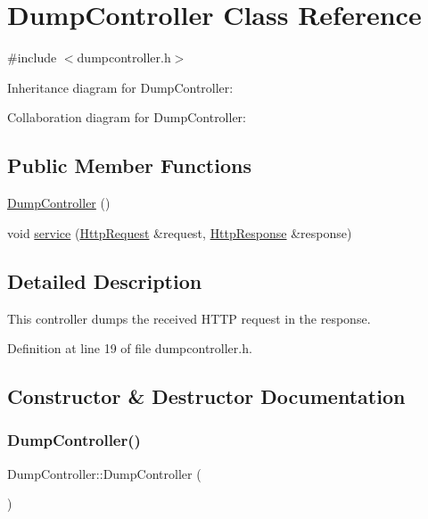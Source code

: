 \hypertarget{class_dump_controller}{}\section{Dump\+Controller Class Reference}
\label{class_dump_controller}


{\ttfamily \#include $<$dumpcontroller.\+h$>$}



Inheritance diagram for Dump\+Controller\+:


Collaboration diagram for Dump\+Controller\+:
\subsection*{Public Member Functions}
\begin{DoxyCompactItemize}
\item 
\mbox{\hyperlink{class_dump_controller_a430cd1a52b540639ad197abb92b4f00d}{Dump\+Controller}} ()
\item 
void \mbox{\hyperlink{class_dump_controller_ab2d5b920d9b2ec9310d2e57ed1e8e32f}{service}} (\mbox{\hyperlink{classstefanfrings_1_1_http_request}{Http\+Request}} \&request, \mbox{\hyperlink{classstefanfrings_1_1_http_response}{Http\+Response}} \&response)
\end{DoxyCompactItemize}


\subsection{Detailed Description}
This controller dumps the received H\+T\+TP request in the response. 

Definition at line 19 of file dumpcontroller.\+h.



\subsection{Constructor \& Destructor Documentation}
\mbox{\label{class_dump_controller_a430cd1a52b540639ad197abb92b4f00d}} 
\subsubsection{\texorpdfstring{Dump\+Controller()}{DumpController()}}
{\footnotesize\ttfamily Dump\+Controller\+::\+Dump\+Controller (\begin{DoxyParamCaption}{ }\end{DoxyParamCaption})}

